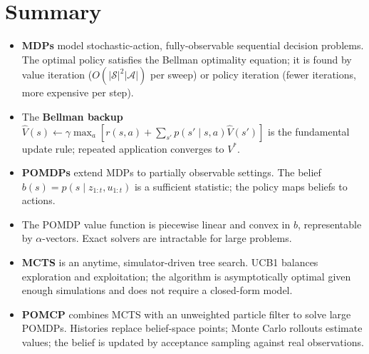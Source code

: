 \documentclass[11pt,a4paper]{article}
\theoremstyle{definition}
\theoremstyle{plain}
\theoremstyle{remark}
\begin{document}
\section{Summary}

\begin{itemize}
    \item \textbf{MDPs} model stochastic-action, fully-observable sequential decision problems. The optimal policy satisfies the Bellman optimality equation; it is found by value iteration ($O(|\mathcal{S}|^2|\mathcal{A}|)$ per sweep) or policy iteration (fewer iterations, more expensive per step).
    \item The \textbf{Bellman backup} $\hat{V}(s) \leftarrow \gamma \max_a [r(s,a) + \sum_{s'} p(s' \mid s,a)\hat{V}(s')]$ is the fundamental update rule; repeated application converges to $V^*$.
    \item \textbf{POMDPs} extend MDPs to partially observable settings. The belief $b(s) = p(s \mid z_{1:t}, u_{1:t})$ is a sufficient statistic; the policy maps beliefs to actions.
    \item The POMDP value function is piecewise linear and convex in $b$, representable by $\alpha$-vectors. Exact solvers are intractable for large problems.
    \item \textbf{MCTS} is an anytime, simulator-driven tree search. UCB1 balances exploration and exploitation; the algorithm is asymptotically optimal given enough simulations and does not require a closed-form model.
    \item \textbf{POMCP} combines MCTS with an unweighted particle filter to solve large POMDPs. Histories replace belief-space points; Monte Carlo rollouts estimate values; the belief is updated by acceptance sampling against real observations.
\end{itemize}
\end{document}

